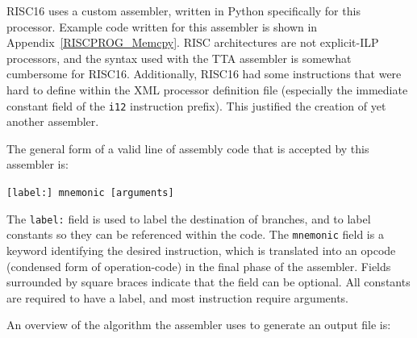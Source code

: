 
RISC16 uses a custom assembler, written in Python specifically for this
processor. Example code written for this assembler is shown in
Appendix~\ref{RISCPROG_Memcpy}. RISC architectures are not explicit-ILP
processors, and the syntax used with the TTA assembler is somewhat cumbersome for
RISC16. Additionally, RISC16 had some instructions that were hard to define
within the XML processor definition file (especially the immediate constant field
of the \texttt{i12} instruction prefix). This justified the creation of yet
another assembler.

\noindent The general form of a valid line of assembly code that is accepted by
this assembler is:

\begin{center}
\tt		[label:] mnemonic [arguments]
\end{center}

The \texttt{label:} field is used to label the destination of branches, and to
label constants so they can be referenced within the code. The \texttt{mnemonic}
field is a keyword identifying the desired instruction, which is translated into
an opcode (condensed form of operation-code) in the final phase of the
assembler. Fields surrounded by square braces indicate that the field can be
optional. All constants are required to have a label, and most instruction
require arguments.

An overview of the algorithm the assembler uses to generate an output file is:

